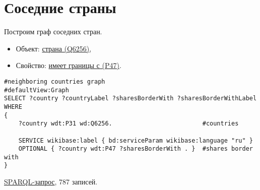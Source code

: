 \section{Соседние страны}

Построим граф соседних стран.

\begin{itemize}
    \item Объект: \href{https://www.wikidata.org/wiki/Q6256}{страна (Q6256)},
    \item Свойство: \href{https://www.wikidata.org/wiki/Property:P47}{имеет границы с (P47)}.
\end{itemize}

\begin{lstlisting}[language=SPARQL]
#neighboring countries graph
#defaultView:Graph
SELECT ?country ?countryLabel ?sharesBorderWith ?sharesBorderWithLabel
WHERE
{
    ?country wdt:P31 wd:Q6256.                         #countries

    SERVICE wikibase:label { bd:serviceParam wikibase:language "ru" }
    OPTIONAL { ?country wdt:P47 ?sharesBorderWith . }  #shares border with
}
\end{lstlisting}

\href{https://query.wikidata.org/#%23neighboring%20countries%20graph%0A%23defaultView%3AGraph%0ASELECT%20%3Fcountry%20%3FcountryLabel%20%3FsharesBorderWith%20%3FsharesBorderWithLabel%0AWHERE%0A%7B%0A%20%20%20%20%3Fcountry%20wdt%3AP31%20wd%3AQ6256.%0A%0A%20%20%20%20SERVICE%20wikibase%3Alabel%20%7B%20bd%3AserviceParam%20wikibase%3Alanguage%20%22ru%22%20%7D%0A%20%20%20%20OPTIONAL%20%7B%20%3Fcountry%20wdt%3AP47%20%3FsharesBorderWith%20.%20%7D%0A%0A%7D%0A}{SPARQL-запрос}, 787 записей.


